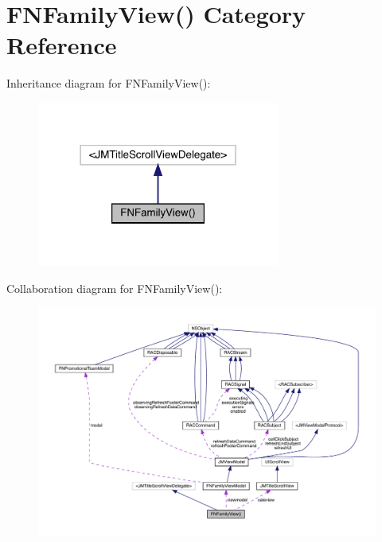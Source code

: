\hypertarget{category_f_n_family_view_07_08}{}\section{F\+N\+Family\+View() Category Reference}
\label{category_f_n_family_view_07_08}


Inheritance diagram for F\+N\+Family\+View()\+:\nopagebreak
\begin{figure}[H]
\begin{center}
\leavevmode
\includegraphics[width=226pt]{category_f_n_family_view_07_08__inherit__graph}
\end{center}
\end{figure}


Collaboration diagram for F\+N\+Family\+View()\+:\nopagebreak
\begin{figure}[H]
\begin{center}
\leavevmode
\includegraphics[width=350pt]{category_f_n_family_view_07_08__coll__graph}
\end{center}
\end{figure}
